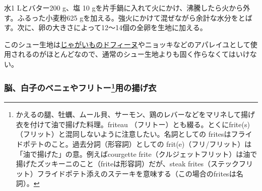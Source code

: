 \begin{recette}


水1 Lとバター200 g、塩 10
gを片手鍋に入れて火にかけ、沸騰したら火から外す。ふるった小麦粉625
gを加える。強火にかけて混ぜながら余計な水分をとばす。次に、卵の大きさによって12〜14個の全卵を生地に加える。

このシュー生地は\protect\hyperlink{pomme-dauphine}{じゃがいものドフィーヌ}やニョッキなどのアパレイユとして使用されるのがほとんどなので、通常のシュー生地よりも固く作らなくてはいけない。

\hypertarget{pate-a-frire-pour-beignet-de-cervelles}{%
\subsubsection[脳、白子のベニェやフリトー用の揚げ衣]{\texorpdfstring{脳、白子のベニェやフリトー\footnote{かえるの腿、牡蠣、ムール貝、サーモン、鶏のレバーなどをマリネして揚げ衣を付けて油で揚げた料理。friteau
  （フリトー）とも綴る。とくにfrite(s)（フリット）と混同しないように注意したい。名詞としての
  fritesはフライドポテトのこと。過去分詞（形容詞）としての
  frit(e)（フリ/フリット）は「油で揚げた」の意。例えばcourgette
  frite（クルジェットフリット）は油で揚げたズッキーニのこと（friteは形容詞）だが、steak
  frites（ステックフリット）フライドポテト添えのステーキを意味する（この場合のfritesは名詞）。}用の揚げ衣}{脳、白子のベニェやフリトー用の揚げ衣}}\label{pate-a-frire-pour-beignet-de-cervelles}}



\end{recette}
